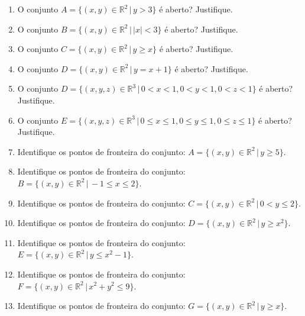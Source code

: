 \documentclass[11pt,a4paper]{article}
\begin{document}
\begin{enumerate}
\item O conjunto $A = \{(x,y) \in \mathbb{R}^2 \,|\, y > 3 \}$ é aberto? Justifique.

\item O conjunto $B = \{(x,y) \in \mathbb{R}^2 \,|\, |x| < 3 \}$ é aberto? Justifique.

\item O conjunto $C = \{(x,y) \in \mathbb{R}^2 \,|\, y \geq x \}$ é aberto? Justifique.

\item O conjunto $D = \{(x,y) \in \mathbb{R}^2 \,|\, y = x + 1 \}$ é aberto? Justifique.

\item O conjunto $D = \{(x,y,z) \in \mathbb{R}^3 \,|\, 0 < x < 1, 0 < y < 1, 0 < z < 1 \}$ é aberto? Justifique.











\item O conjunto $E = \{(x,y,z) \in \mathbb{R}^3 \,|\, 0 \leq x \leq 1, 0 \leq y \leq 1, 0 \leq z \leq 1 \}$ é aberto? Justifique.

\item Identifique os pontos de fronteira do conjunto: $A = \{(x,y) \in \mathbb{R}^2 \,|\, y \geq 5 \}$.

\item Identifique os pontos de fronteira do conjunto: $B = \{(x,y) \in \mathbb{R}^2 \,|\, -1 \leq x \leq 2 \}$.

\item Identifique os pontos de fronteira do conjunto: $C = \{(x,y) \in \mathbb{R}^2 \,|\, 0 < y \leq 2 \}$.

\item Identifique os pontos de fronteira do conjunto: $D = \{(x,y) \in \mathbb{R}^2 \,|\, y \geq x^2 \}$.

\item Identifique os pontos de fronteira do conjunto: $E = \{(x,y) \in \mathbb{R}^2 \,|\, y \leq x^2 - 1 \}$.

\item Identifique os pontos de fronteira do conjunto: $F = \{(x,y) \in \mathbb{R}^2 \,|\, x^2 + y^2 \leq 9 \}$.

\item Identifique os pontos de fronteira do conjunto: $G = \{(x,y) \in \mathbb{R}^2 \,|\, y \geq x \}$.














\end{enumerate}
\end{document}
